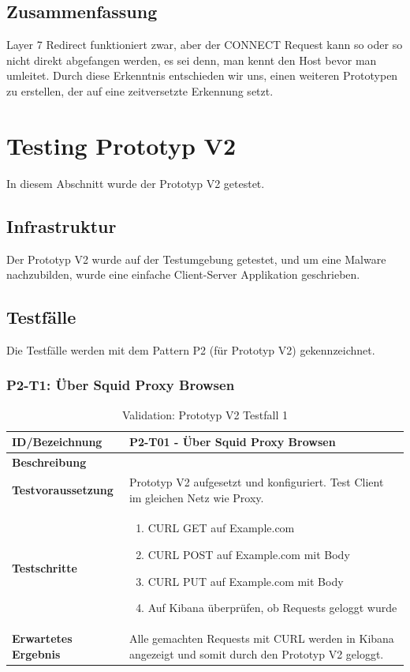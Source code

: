 \subsection{Zusammenfassung}
Layer 7 Redirect funktioniert zwar, aber der CONNECT Request kann so oder so nicht direkt abgefangen werden, es sei denn, man kennt den Host bevor man umleitet.
Durch diese Erkenntnis entschieden wir uns, einen weiteren Prototypen zu erstellen, der auf eine zeitversetzte Erkennung setzt.


\section{Testing Prototyp V2}
\label{pocvalid:v2}
In diesem Abschnitt wurde der Prototyp V2 getestet.
\subsection{Infrastruktur}
Der Prototyp V2 wurde auf der Testumgebung getestet, und um eine Malware nachzubilden, wurde eine einfache Client-Server Applikation geschrieben.
\subsection{Testfälle}
Die Testfälle werden mit dem Pattern P2 (für Prototyp V2) gekennzeichnet.


\begin{table}[H]
\subsubsection{P2-T1: Über Squid Proxy Browsen}
    \centering
	\begin{tabularx}{\textwidth}{| l | p{} |}
        \hline
        \textbf{ID/Bezeichnung} & P2-T01 - Über Squid Proxy Browsen\\ \hline
        \textbf{Beschreibung} &  \\ \hline  
        \textbf{Testvoraussetzung} & Prototyp V2 aufgesetzt und konfiguriert. Test Client im gleichen Netz wie Proxy. \\ \hline      
        \textbf{Testschritte} & \begin{enumerate}
        	\item CURL GET auf Example.com
        	\item CURL POST auf Example.com mit Body
        	\item CURL PUT auf Example.com mit Body
        	\item Auf Kibana überprüfen, ob Requests geloggt wurde
        \end{enumerate} \\ \hline    
        \textbf{Erwartetes Ergebnis} & Alle gemachten Requests mit CURL werden in Kibana angezeigt und somit durch den Prototyp V2 geloggt. \\ \hline      
    \end{tabularx}
    \caption{Validation: Prototyp V2 Testfall 1}
\end{table}



